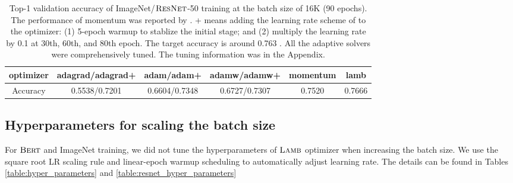 \documentclass{article} \usepackage{iclr2020_conference,times}
\newcommand{\resnet}{\textsc{ResNet}}
\newcommand{\bert}{\textsc{Bert}\xspace}
\newcommand{\adam}{\textsc{Adam}}
\newcommand{\lamb}{\textsc{Lamb}}
\begin{document}
\iffalse
\begin{figure*}[tb]
\vspace{5pt}
\centering
\texttt{[image: figs/imagenet\_resnet50.png]}
\caption{$\lamb$ is able to achieve state-of-the-art accuracy in ImageNet/ResNet-50 training for large-batch training. The performance of momentum solver was reported by \citep{goyal2017accurate}. $\adam +$ means adding the learning rate scheme of \cite{goyal2017accurate} to $\adam$: (1) 5-epoch warmup to stablize the initial stage; and (2) multiply the learning rate by 0.1 at 30th, 60th, and 80th epoch. The target accuracy is around 0.763 \citep{goyal2017accurate}. All the adaptive solvers were comprehensively tuned. The tuning information was in the appendix of this paper.}
\label{fig:resnet50_acc}
\vspace{-10pt}
\end{figure*}
\fi

\begin{table}[ht]
\renewcommand{\arraystretch}{1.3}
\caption{ Top-1 validation accuracy of ImageNet/$\resnet$-50 training at the batch size of 16K (90 epochs). The performance of momentum was reported by \citep{goyal2017accurate}. + means adding the learning rate scheme of \cite{goyal2017accurate} to the optimizer: (1) 5-epoch warmup to stablize the initial stage; and (2) multiply the learning rate by 0.1 at 30th, 60th, and 80th epoch. The target accuracy is around 0.763 \citep{goyal2017accurate}. All the adaptive solvers were comprehensively tuned. The tuning information was in the Appendix.}
\centering

\begin{tabular}{|c|c|c|c|c|c|}
\hline
optimizer & adagrad/adagrad+ & adam/adam+ & adamw/adamw+ & momentum & lamb \\
\hline
\hline
Accuracy & 0.5538/0.7201 & 0.6604/0.7348 & 0.6727/0.7307 & 0.7520 & 0.7666  \\
\hline
\end{tabular}
\label{table:resnet50_acc}
\end{table}

\subsection{Hyperparameters for scaling the batch size}
For $\bert$ and ImageNet training, we did not tune the hyperparameters of $\lamb$ optimizer when increasing the batch size. We use the square root LR scaling rule and linear-epoch warmup scheduling to automatically adjust learning rate. The details can be found in Tables \ref{table:hyper_parameters} and \ref{table:resnet_hyper_parameters}
\end{document}
